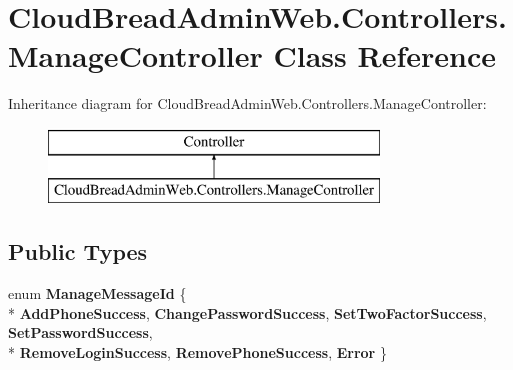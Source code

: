 \hypertarget{class_cloud_bread_admin_web_1_1_controllers_1_1_manage_controller}{}\section{Cloud\+Bread\+Admin\+Web.\+Controllers.\+Manage\+Controller Class Reference}
\label{class_cloud_bread_admin_web_1_1_controllers_1_1_manage_controller}
Inheritance diagram for Cloud\+Bread\+Admin\+Web.\+Controllers.\+Manage\+Controller\+:\begin{figure}[H]
\begin{center}
\leavevmode
\includegraphics[height=2.000000cm]{class_cloud_bread_admin_web_1_1_controllers_1_1_manage_controller}
\end{center}
\end{figure}
\subsection*{Public Types}
\begin{DoxyCompactItemize}
\item 
enum {\bfseries Manage\+Message\+Id} \{ \\*
{\bfseries Add\+Phone\+Success}, 
{\bfseries Change\+Password\+Success}, 
{\bfseries Set\+Two\+Factor\+Success}, 
{\bfseries Set\+Password\+Success}, 
\\*
{\bfseries Remove\+Login\+Success}, 
{\bfseries Remove\+Phone\+Success}, 
{\bfseries Error}
 \}\hypertarget{class_cloud_bread_admin_web_1_1_controllers_1_1_manage_controller_a9fa3bbaaee70bae3844f95a7c379719d}{}\label{class_cloud_bread_admin_web_1_1_controllers_1_1_manage_controller_a9fa3bbaaee70bae3844f95a7c379719d}

\end{DoxyCompactItemize}
